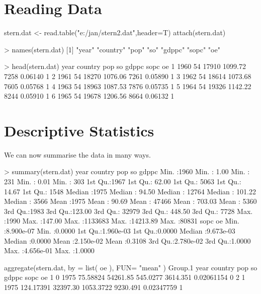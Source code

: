 \documentclass[landscape,letterpaper,9pt]{article}
\begin{document}
\newpage
\section{Reading Data}
\begin{CVerbatim}
stern.dat <- read.table("e:/jan/stern2.dat",header=T)
attach(stern.dat)

> names(stern.dat)
[1] "year"    "country" "pop"     "so"      "gdppc"   "sopc"    "oe"

> head(stern.dat)
  year country   pop      so gdppc    sopc oe
1 1960      54 17910 1099.72  7258 0.06140  1
2 1961      54 18270 1076.06  7261 0.05890  1
3 1962      54 18614 1073.68  7605 0.05768  1
4 1963      54 18963 1087.53  7876 0.05735  1
5 1964      54 19326 1142.22  8244 0.05910  1
6 1965      54 19678 1206.56  8664 0.06132  1

\end{CVerbatim}
%
\newpage
\section{Descriptive Statistics}

We  can now summarise the data in many ways.
%
%
\begin{CVerbatim}
> summary(stern.dat)
      year         country            pop                so               gdppc
 Min.   :1960   Min.   :  1.00   Min.   :    231   Min.   :    0.01   Min.   :  303
 1st Qu.:1967   1st Qu.: 62.00   1st Qu.:   5063   1st Qu.:   14.67   1st Qu.: 1548
 Median :1975   Median : 94.50   Median :  12764   Median :  101.22   Median : 3566
 Mean   :1975   Mean   : 90.69   Mean   :  47466   Mean   :  703.03   Mean   : 5360
 3rd Qu.:1983   3rd Qu.:123.00   3rd Qu.:  32979   3rd Qu.:  448.50   3rd Qu.: 7728
 Max.   :1990   Max.   :147.00   Max.   :1133683   Max.   :14213.89   Max.   :80831
      sopc                 oe
 Min.   :8.900e-07   Min.   :0.0000
 1st Qu.:1.960e-03   1st Qu.:0.0000
 Median :9.673e-03   Median :0.0000
 Mean   :2.150e-02   Mean   :0.3108
 3rd Qu.:2.780e-02   3rd Qu.:1.0000
 Max.   :4.656e-01   Max.   :1.0000
\end{CVerbatim}
\newpage
\begin{CVerbatim}
  aggregate(stern.dat, by = list( oe ),  FUN= "mean" )
  Group.1 year   country      pop        so    gdppc       sopc oe
1       0 1975  75.58824 54261.85  545.0277 3614.351 0.02061154  0
2       1 1975 124.17391 32397.30 1053.3722 9230.491 0.02347759  1

\end{CVerbatim}
%
\end{document}
